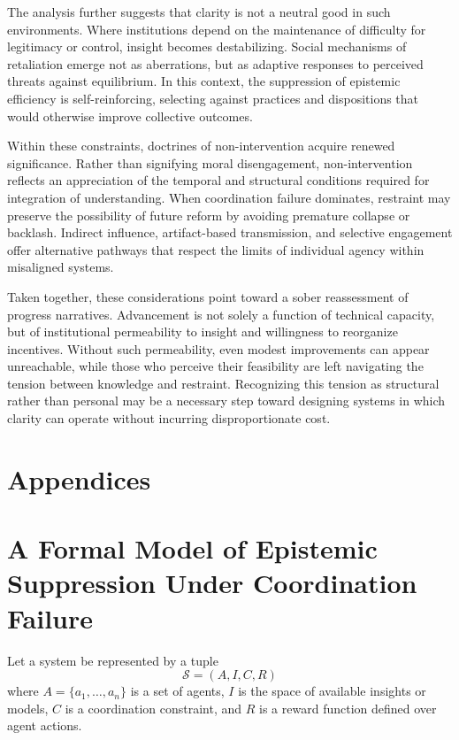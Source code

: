 \documentclass[12pt]{article}
\begin{document}
The analysis further suggests that clarity is not a neutral good in such environments. Where institutions depend on the maintenance of difficulty for legitimacy or control, insight becomes destabilizing. Social mechanisms of retaliation emerge not as aberrations, but as adaptive responses to perceived threats against equilibrium. In this context, the suppression of epistemic efficiency is self-reinforcing, selecting against practices and dispositions that would otherwise improve collective outcomes.

Within these constraints, doctrines of non-intervention acquire renewed significance. Rather than signifying moral disengagement, non-intervention reflects an appreciation of the temporal and structural conditions required for integration of understanding. When coordination failure dominates, restraint may preserve the possibility of future reform by avoiding premature collapse or backlash. Indirect influence, artifact-based transmission, and selective engagement offer alternative pathways that respect the limits of individual agency within misaligned systems.

Taken together, these considerations point toward a sober reassessment of progress narratives. Advancement is not solely a function of technical capacity, but of institutional permeability to insight and willingness to reorganize incentives. Without such permeability, even modest improvements can appear unreachable, while those who perceive their feasibility are left navigating the tension between knowledge and restraint. Recognizing this tension as structural rather than personal may be a necessary step toward designing systems in which clarity can operate without incurring disproportionate cost.

\newpage
\section*{Appendices}

\appendix

\section{A Formal Model of Epistemic Suppression Under Coordination Failure}

Let a system be represented by a tuple
\[
\mathcal{S} = (A, I, C, R)
\]
where \(A = \{a_1,\dots,a_n\}\) is a set of agents, \(I\) is the space of available insights or models, \(C\) is a coordination constraint, and \(R\) is a reward function defined over agent actions.
\end{document}
